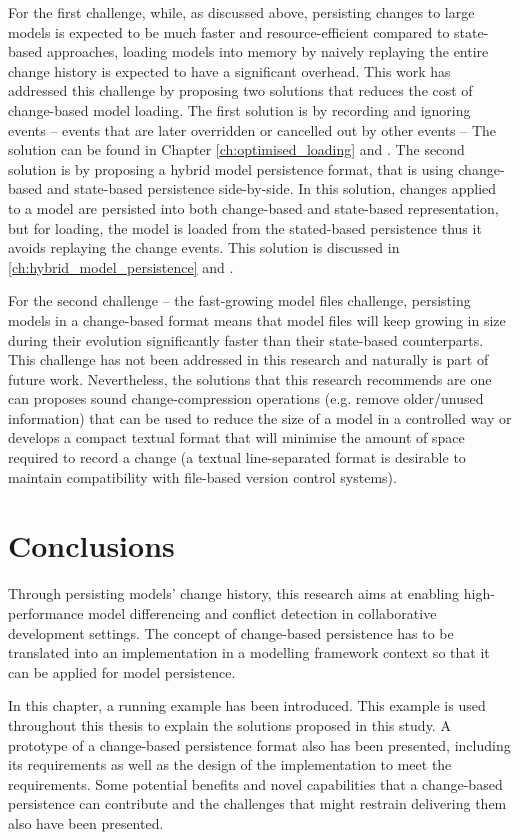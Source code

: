 For the first challenge, while, as discussed above, persisting changes to large models is expected to be much faster and resource-efficient compared to state-based approaches, loading models into memory by naively replaying the entire change history is expected to have a significant overhead. This work has addressed this challenge by proposing two solutions that reduces the cost of change-based model loading. The first solution is by recording and ignoring events -- events that are later overridden or cancelled out by other events -- The solution can be found in Chapter \ref{ch:optimised_loading} and \cite{yohannis2018towards}. The second solution is by proposing a hybrid model persistence format, that is using change-based and state-based persistence side-by-side. In this solution, changes applied to a model are persisted into both change-based and state-based representation, but for loading, the model is loaded from the stated-based persistence thus it avoids replaying the change events. This solution is discussed in \ref{ch:hybrid_model_persistence} and \cite{DBLP:conf/models/YohannisRPK18}. 

For the second challenge -- the fast-growing model files challenge, persisting models in a change-based format means that model files will keep growing in size during their evolution significantly faster than their state-based counterparts. This challenge has not been addressed in this research and naturally is part of future work. Nevertheless, the solutions that this research recommends are one can proposes sound change-compression operations (e.g. remove older/unused information) that can be used to reduce the size of a model in a controlled way or develops a compact textual format that will minimise the amount of space required to record a change (a textual line-separated format is desirable to maintain compatibility with file-based version control systems).   

\section{Conclusions}
\label{sec:conclusions_3}
Through persisting models' change history, this research aims at enabling high-performance model differencing and conflict detection in collaborative development settings. The concept of change-based persistence has to be translated into an implementation in a modelling framework context so that it can be applied for model persistence. 

In this chapter, a running example has been introduced. This example is used throughout this thesis to explain the solutions proposed in this study. A prototype of a change-based persistence format also has been presented, including its requirements as well as the design of the implementation to meet the requirements. Some potential benefits and novel capabilities that a change-based persistence can contribute and the challenges that might restrain delivering them also have been presented.   

